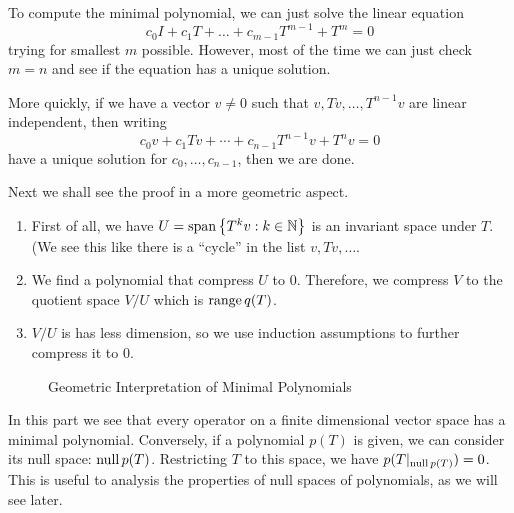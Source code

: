 \documentclass[../main.tex]{subfiles}
\begin{document}
\begin{remark}
To compute the minimal polynomial, we can just solve the linear equation
\begin{equation*}
	c_0I+c_1T+\ldots +c_{m-1}T^{m-1}+T^m = 0
\end{equation*}
trying for smallest $m$ possible. However, most of the time we can just check $m=n$ and see if the equation has a unique solution.

More quickly, if we have a vector $v\neq 0$ such that $v,Tv, \ldots ,T^{n-1}v$ are linear independent, then writing
\begin{equation*}
 c_0v+c_1Tv+ \cdots +c_{n-1}T^{n-1}v + T^nv=0
\end{equation*}
have a unique solution for $c_0, \ldots ,c_{n-1}$, then we are done.

Next we shall see the proof in a more geometric aspect.
\begin{enumerate}
	\item First of all, we have $U = \operatorname{span} \left\{ T^kv: k\in \mathbb{N} \right\}$ is an invariant space under $T$. (We see this like there is a ``cycle'' in the list $v, Tv, \ldots $.
	\item We find a polynomial that compress $U$ to $0$. Therefore, we compress $V$ to the quotient space $V / U$ which is $\operatorname{range} q(T)$.
	\item $V / U$ is has less dimension, so we use induction assumptions to further compress it to $0$.
\end{enumerate}
\begin{figure}[H]
    \centering
    \caption{Geometric Interpretation of Minimal Polynomials}
    \label{fig:geometric-interpretation-of-minimal-polynomials}
\end{figure}

In this part we see that every operator on a finite dimensional vector space has a minimal polynomial. Conversely, if a polynomial $p(T)$ is given, we can consider its null space: $\operatorname{null} p(T)$. Restricting $T$ to this space, we have $p(T|_{\operatorname{null} p(T)}) = 0$. This is useful to analysis the properties of null spaces of polynomials, as we will see later.
\end{remark}
\end{document}
